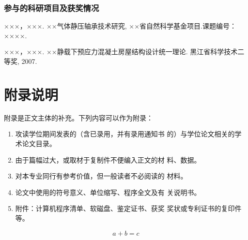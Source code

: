 \begin{appendixenv}
\subsubsection{参与的科研项目及获奖情况}

\begin{achievements}
    \item ×××，×××. ××气体静压轴承技术研究, ××省自然科学基金项目.课题编号：××××.
    \item ×××，×××. ××静载下预应力混凝土房屋结构设计统一理论. 黑江省科学技术二等奖, 2007.
\end{achievements}

\newpage
\section*{附录说明}
附录是正文主体的补充。下列内容可以作为附录：
\begin{enumerate}
    \item 攻读学位期间发表的（含已录用，并有录用通知书
    的）与学位论文相关的学术论文目录。
    \item 由于篇幅过大，或取材于复制件不便编入正文的材
    料、数据。
    \item 对本专业同行有参考价值，但一般读者不必阅读的
    材料。
    \item 论文中使用的符号意义、单位缩写、程序全文及有
    关说明书。
    \item 附件：计算机程序清单、软磁盘、鉴定证书、获奖
    奖状或专利证书的复印件等。
\end{enumerate}

\begin{align}
    a+b=c
\end{align}

\end{appendixenv}
